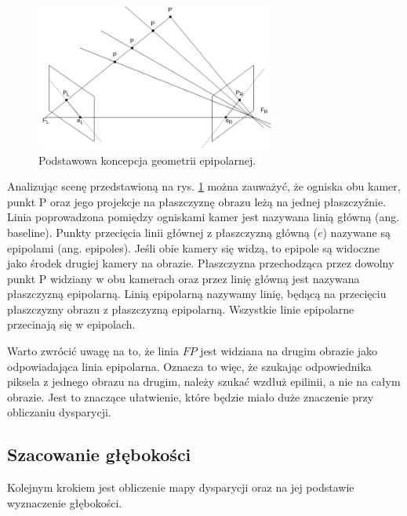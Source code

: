 \documentclass[oneside, eng]{mgr}
\begin{document}
\begin{figure}
\centering
	\includegraphics[width=0.70\textwidth]{epipolar.jpg}\par\vspace{1cm}
\caption{Podstawowa koncepcja geometrii epipolarnej.}
	\label{fig:epipolar_scene}
\end{figure}

Analizując scenę przedstawioną na rys. \ref{fig:epipolar_scene} można zauważyć, że ogniska obu kamer, punkt P oraz jego projekcje na płaszczyznę obrazu leżą na jednej płaszczyźnie. Linia poprowadzona pomiędzy ogniskami kamer jest nazywana linią główną (ang. baseline). 
Punkty przecięcia linii głównej z płaszczyzną główną ($e$) nazywane są epipolami (ang. epipoles). Jeśli obie kamery się widzą, to epipole są widoczne jako środek drugiej kamery na obrazie.
Płaszczyzna przechodząca przez dowolny punkt P widziany w obu kamerach oraz przez linię główną jest nazywana płaszczyzną epipolarną.
Linią epipolarną nazywamy linię, będącą na przecięciu płaszczyzny obrazu z płaszczyzną epipolarną. Wszystkie linie epipolarne przecinają się w epipolach.

Warto zwrócić uwagę na to, że linia $F P$ jest widziana na drugim obrazie jako odpowiadająca linia epipolarna. Oznacza to więc, że szukając odpowiednika piksela z jednego obrazu na drugim, należy szukać wzdłuż epilinii, a nie na całym obrazie. Jest to znaczące ułatwienie, które będzie miało duże znaczenie przy obliczaniu dysparycji.

\subsection{Szacowanie głębokości}

Kolejnym krokiem jest obliczenie mapy dysparycji oraz na jej podstawie wyznaczenie głębokości. 
\end{document}
